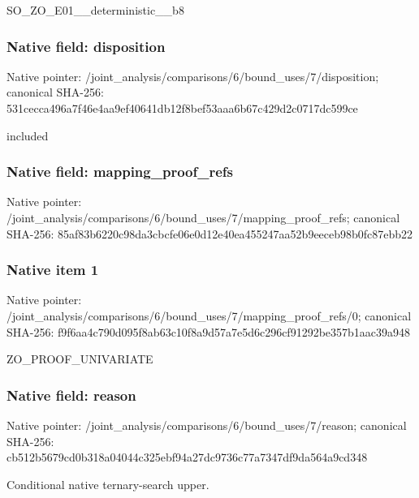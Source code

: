 \documentclass[10pt,a4paper]{article}
\begin{document}
\begingroup\raggedright\sloppy SO\_\allowbreak{}ZO\_\allowbreak{}E01\_\allowbreak{}\_\allowbreak{}deterministic\_\allowbreak{}\_\allowbreak{}b8\par\endgroup

\subsubsection{Native field: disposition}
Native pointer: /joint\_\allowbreak{}analysis/comparisons/6/bound\_\allowbreak{}uses/7/disposition; canonical SHA-256: 531cecca496a7f46e4aa9ef40641db12f8bef53aaa6b67c429d2c0717dc599ce

\begingroup\raggedright\sloppy included\par\endgroup

\subsubsection{Native field: mapping\_\allowbreak{}proof\_\allowbreak{}refs}
Native pointer: /joint\_\allowbreak{}analysis/comparisons/6/bound\_\allowbreak{}uses/7/mapping\_\allowbreak{}proof\_\allowbreak{}refs; canonical SHA-256: 85af83b6220c98da3cbcfe06e0d12e40ea455247aa52b9eeceb98b0fc87ebb22

\subsubsection{Native item 1}
Native pointer: /joint\_\allowbreak{}analysis/comparisons/6/bound\_\allowbreak{}uses/7/mapping\_\allowbreak{}proof\_\allowbreak{}refs/0; canonical SHA-256: f9f6aa4c790d095f8ab63c10f8a9d57a7e5d6c296cf91292be357b1aac39a948

\begingroup\raggedright\sloppy ZO\_\allowbreak{}PROOF\_\allowbreak{}UNIVARIATE\par\endgroup

\subsubsection{Native field: reason}
Native pointer: /joint\_\allowbreak{}analysis/comparisons/6/bound\_\allowbreak{}uses/7/reason; canonical SHA-256: cb512b5679cd0b318a04044c325ebf94a27dc9736c77a7347df9da564a9cd348

\begingroup\raggedright\sloppy Conditional native ternary-search upper.\par\endgroup
\end{document}
